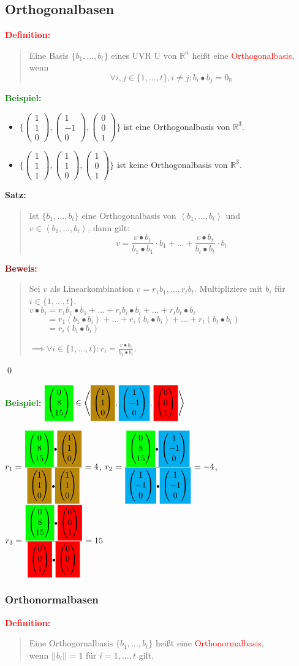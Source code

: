 \documentclass{article}
\newcommand{\red}[1]{\textcolor{red}{#1}}
\newcommand{\green}[1]{\textcolor{green}{#1}}
\newcommand{\dgr}[1]{\textcolor{dgr}{#1}}
\newcommand{\maroon}[1]{\textcolor{maroon}{#1}}
\newcommand{\hcyan}[1]{\colorbox{cyan}{#1}}
\newcommand{\hgreen}[1]{\colorbox{green}{#1}}
\newcommand{\hred}[1]{\colorbox{red}{#1}}
\newcommand{\hdgr}[1]{\colorbox{dgr}{#1}}
\newcommand{\ex}{\green{\textbf{Beispiel: }}}
\newcommand{\de}[1]{\red{\textbf{Definition: }}\begin{quote}#1\end{quote}}
\newcommand{\se}[1]{\dgr{\textbf{Satz: }}\begin{quote}#1\end{quote}}
\newcommand{\pr}[1]{\maroon{\textbf{Beweis: }}\begin{quote}#1\end{quote}\qed}
\newcommand{\R}{\mathbb{R}}
\newcommand{\no}[1]{||#1||}
\newcommand{\vvvec}[3]{\begin{pmatrix}#1\\#2\\#3\end{pmatrix}}
\newcommand{\spann}[1]{\left\langle#1\right\rangle}
\begin{document}
\subsection{Orthogonalbasen}

\de{
    Eine Basis $\{b_1, \dots, b_t\}$ eines UVR U von $\R^n$ heißt eine \red{Orthogonalbasis}, wenn
    \[
        \forall i, j \in \{1, \dots, t\}, i \ne j: b_i \bullet b_j = 0_{\R}
    \]
}

\ex \begin{itemize}
    \item $\{\vvvec{1}{1}{0}, \vvvec{1}{-1}{0}, \vvvec{0}{0}{1}\}$ ist eine Orthogonalbasis von $\R^3$.
    \item $\{\vvvec{1}{1}{1}, \vvvec{1}{1}{0}, \vvvec{1}{0}{1}\}$ ist keine Orthogonalbasis von $\R^3$.
\end{itemize}

\se{
    Ist $\{b_1, \dots, b_t\}$ eine Orthogonalbasis von $\spann{b_1, \dots, b_t}$ und\\
    $v \in \spann{b_1, \dots, b_t}$, dann gilt:
    \[
        v = \frac{v \bullet b_1}{b_1 \bullet b_1} \cdot b_1 + \dots + \frac{v \bullet b_t}{b_t \bullet b_t} \cdot b_t
    \]
}
\pr{
    Sei $v$ als Linearkombination $v = r_1b_1, \dots, r_tb_t$. Multipliziere mit $b_i$ für $i \in \{1, \dots, t\}$.\\
    $v \bullet b_i = r_1b_1 \bullet b_1 + \dots + r_ib_i \bullet b_i + \dots + r_tb_t \bullet b_i$\\
    $\phantom{v \bullet b_i} = r_1 (b_1 \bullet b_i) + \dots + r_i (b_i \bullet b_i) + \dots + r_t (b_t \bullet b_i)$\\
    $\phantom{v \bullet b_i} = r_i (b_i \bullet b_i)$
    
    $\implies \forall i \in \{1, \dots, t\}: r_i = \frac{v \bullet b_i}{b_1 \bullet b_i}$.
}

\ex $\hgreen{$\vvvec{0}{8}{15}$} \in \spann{\hdgr{$\vvvec{1}{1}{0}$}, \hcyan{$\vvvec{1}{-1}{0}$}, \hred{$\vvvec{0}{0}{1}$}}$

{\small$r_1 = \frac{\hgreen{$\vvvec{0}{8}{15}$} \bullet \hdgr{$\vvvec{1}{1}{0}$}}{\hdgr{$\vvvec{1}{1}{0}$} \bullet \hdgr{$\vvvec{1}{1}{0}$}} = 4$,
$r_2 = \frac{\hgreen{$\vvvec{0}{8}{15}$} \bullet \hcyan{$\vvvec{1}{-1}{0}$}}{\hcyan{$\vvvec{1}{-1}{0}$} \bullet \hcyan{$\vvvec{1}{-1}{0}$}} = -4$,
$r_3 = \frac{\hgreen{$\vvvec{0}{8}{15}$} \bullet \hred{$\vvvec{0}{0}{1}$}}{\hred{$\vvvec{0}{0}{1}$} \bullet \hred{$\vvvec{0}{0}{1}$}} = 15$}

\subsubsection{Orthonormalbasen}
\de{
    Eine Orthogornalbasis $\{b_1, \dots, b_t\}$ heißt eine \red{Orthonormalbasis},\\
    wenn $\no{b_i} = 1$ für $i = 1, \dots, t$ gilt.
}
\end{document}
